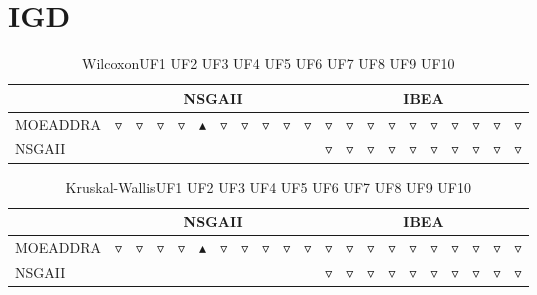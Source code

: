 \documentclass{article}
\begin{document}
\newpage
\section{IGD}

\begin{table}[!h]
\caption{WilcoxonUF1 UF2 UF3 UF4 UF5 UF6 UF7 UF8 UF9 UF10 }
\label{Table:wilcoxon}
\centering
\begin{scriptsize}
\begin{tabular}{| l | p{0.03cm }p{0.03cm }p{0.03cm }p{0.03cm }p{0.03cm }p{0.03cm }p{0.03cm }p{0.03cm }p{0.03cm }p{0.03cm } | p{0.03cm }p{0.03cm }p{0.03cm }p{0.03cm }p{0.03cm }p{0.03cm }p{0.03cm }p{0.03cm }p{0.03cm }p{0.03cm } | }
\hline \multicolumn{1}{|c|}{} & \multicolumn{10}{c|}{NSGAII}& \multicolumn{10}{c|}{IBEA}\\
\hline 
MOEADDRA  & $\triangledown$&$\triangledown$&$\triangledown$&$\triangledown$&$\blacktriangle$&$\triangledown$&$\triangledown$&$\triangledown$&$\triangledown$&$\triangledown$ & $\triangledown$&$\triangledown$&$\triangledown$&$\triangledown$&$\triangledown$&$\triangledown$&$\triangledown$&$\triangledown$&$\triangledown$&$\triangledown$ \\ 
NSGAII  &   &  &  &  &  &  &  &  &  &   & $\triangledown$&$\triangledown$&$\triangledown$&$\triangledown$&$\triangledown$&$\triangledown$&$\triangledown$&$\triangledown$&$\triangledown$&$\triangledown$ \\ 
\hline
\end{tabular}
\end{scriptsize}
\end{table}


\begin{table}[!h]
\caption{Kruskal-WallisUF1 UF2 UF3 UF4 UF5 UF6 UF7 UF8 UF9 UF10 }
\label{Table:kruskal}
\centering
\begin{scriptsize}
\begin{tabular}{| l | p{0.03cm }p{0.03cm }p{0.03cm }p{0.03cm }p{0.03cm }p{0.03cm }p{0.03cm }p{0.03cm }p{0.03cm }p{0.03cm } | p{0.03cm }p{0.03cm }p{0.03cm }p{0.03cm }p{0.03cm }p{0.03cm }p{0.03cm }p{0.03cm }p{0.03cm }p{0.03cm } | }
\hline \multicolumn{1}{|c|}{} & \multicolumn{10}{c|}{NSGAII}& \multicolumn{10}{c|}{IBEA}\\
\hline 
MOEADDRA  & $\triangledown$&$\triangledown$&$\triangledown$&$\triangledown$&$\blacktriangle$&$\triangledown$&$\triangledown$&$\triangledown$&$\triangledown$&$\triangledown$ & $\triangledown$&$\triangledown$&$\triangledown$&$\triangledown$&$\triangledown$&$\triangledown$&$\triangledown$&$\triangledown$&$\triangledown$&$\triangledown$ \\ 
NSGAII  &   &  &  &  &  &  &  &  &  &   & $\triangledown$&$\triangledown$&$\triangledown$&$\triangledown$&$\triangledown$&$\triangledown$&$\triangledown$&$\triangledown$&$\triangledown$&$\triangledown$ \\ 
\hline
\end{tabular}
\end{scriptsize}
\end{table}
\end{document}
